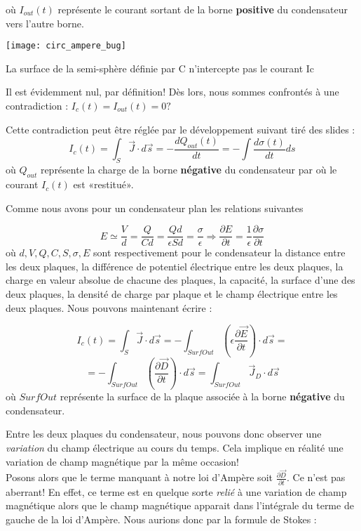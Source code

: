 où $I_{out}(t)$ représente le courant sortant de la borne \textbf{positive} du condensateur vers l'autre borne. 
\begin{marginfigure}[0cm]
	\texttt{[image: circ\_ampere\_bug]}
	\caption{La surface de la semi-sphère définie par C n'intercepte pas le courant Ic}
\end{marginfigure}
Il est évidemment nul, par définition! Dès lors, nous sommes confrontés à une contradiction : $I_{c}(t) = I_{out}(t) = 0?$ 

Cette contradiction peut être réglée par le développement suivant tiré des slides :
\[I_{c}(t) = \int_{S} \vec{J} \cdot d\vec{s} = -\frac{dQ_{out}(t)}{dt} = - \int \frac{d \sigma(t)}{dt} ds\] 
où $Q_{out}$ représente la charge de la borne \textbf{négative} du condensateur par où le courant $I_{c}(t)$ est «restitué».

Comme nous avons pour un condensateur plan les relations suivantes  

\[ E \simeq \frac{V}{d} = \frac{Q}{Cd} = \frac{Qd}{\epsilon S d} = \frac{\sigma}{\epsilon} \Rightarrow \frac{\partial E}{\partial t} = \frac{1}{\epsilon} \frac{\partial \sigma}{\partial t} \]
où $d,V,Q,C,S,\sigma,E$ sont respectivement pour le condensateur la distance entre les deux plaques, la différence de potentiel électrique entre les deux plaques, la charge en valeur absolue de chacune des plaques, 
la capacité, la surface d'une des deux plaques, la densité de charge par plaque et le champ électrique entre les deux plaques.
Nous pouvons maintenant écrire :

\[ I_{c}(t) = \int_{S} \vec{J} \cdot d\vec{s} = -\int_{SurfOut}( \epsilon \frac{\partial \vec{E}}{\partial t} )\cdot d\vec{s} = \]
\[ = - \int_{SurfOut} (\frac{\partial \vec{D}}{\partial t}) \cdot d\vec{s}  =  \int_{SurfOut} \vec{J}_{D} \cdot d\vec{s}\]
où $SurfOut$ représente la surface de la plaque associée à la borne \textbf{négative} du condensateur.

Entre les deux plaques du condensateur, nous pouvons donc observer une \textit{variation} du champ électrique au cours du temps. Cela implique en réalité une variation de champ magnétique par la même occasion! \\
Posons alors que le terme manquant à notre loi d'Ampère soit $\frac{\partial \vec{D}}{\partial t}$. Ce n'est pas aberrant!
En effet, ce terme est en quelque sorte \textit{relié} à une variation de champ magnétique alors que le champ magnétique apparait dans l'intégrale du terme de gauche de la loi d'Ampère.
Nous aurions donc par la formule de Stokes : 

